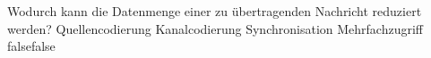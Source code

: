     {Wodurch kann die Datenmenge einer zu übertragenden Nachricht reduziert werden?}
    {Quellencodierung}
    {Kanalcodierung}
    {Synchronisation}
    {Mehrfachzugriff}
    {false}{false}